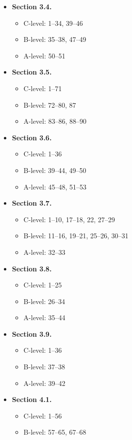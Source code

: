 \documentclass[11pt]{article}
\begin{document}
\begin{itemize}
\item \textbf{Section 3.4.}
  \begin{itemize}
  \item C-level: 1--34, 39--46
  \item B-level: 35--38, 47--49
  \item A-level: 50--51
  \end{itemize}
\item \textbf{Section 3.5.}
  \begin{itemize}
  \item C-level: 1--71
  \item B-level: 72--80, 87
  \item A-level: 83--86, 88--90
  \end{itemize}
\item \textbf{Section 3.6.}
  \begin{itemize}
  \item C-level: 1--36
  \item B-level: 39--44, 49--50
  \item A-level: 45--48, 51--53
  \end{itemize}
\item \textbf{Section 3.7.}
  \begin{itemize}
  \item C-level: 1--10, 17--18, 22, 27--29
  \item B-level: 11--16, 19--21, 25--26, 30--31
  \item A-level: 32--33
  \end{itemize}
\item \textbf{Section 3.8.}
  \begin{itemize}
    \item C-level: 1--25
      \item B-level: 26--34
        \item A-level: 35--44
\end{itemize}	
\item \textbf{Section 3.9.}
  \begin{itemize}
    \item C-level: 1--36
      \item B-level: 37--38
        \item A-level: 39--42
\end{itemize}
\item \textbf{Section 4.1.}
\begin{itemize}
  \item C-level: 1--56
    \item B-level: 57--65, 67--68

\end{itemize}
\end{itemize}
\end{document}
